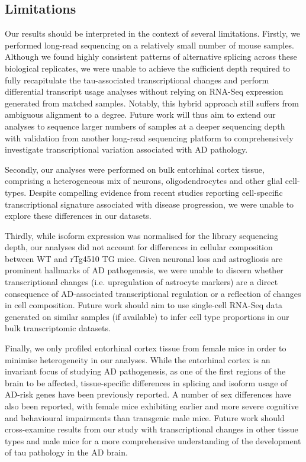 \subsection{Limitations}
Our results should be interpreted in the context of several limitations. Firstly, we performed long-read sequencing on a relatively small number of mouse samples. Although we found highly consistent patterns of alternative splicing across these biological replicates, we were unable to achieve the sufficient depth required to fully recapitulate the tau-associated transcriptional changes and perform differential transcript usage analyses without relying on RNA-Seq expression generated from matched samples. Notably, this hybrid approach still suffers from ambiguous alignment to a degree. Future work will thus aim to extend our analyses to sequence larger numbers of samples at a deeper sequencing depth with validation from another long-read sequencing platform to comprehensively investigate transcriptional variation associated with AD pathology. 

Secondly, our analyses were performed on bulk entorhinal cortex tissue, comprising a heterogeneous mix of neurons, oligodendrocytes and other glial cell-types. Despite compelling evidence from recent studies reporting cell-specific transcriptional signature associated with disease progression, we were unable to explore these differences in our datasets. 

Thirdly, while isoform expression was normalised for the library sequencing depth, our analyses did not account for differences in cellular composition between WT and rTg4510 TG mice. Given neuronal loss and astrogliosis are prominent hallmarks of AD pathogenesis, we were unable to discern whether transcriptional changes (i.e. upregulation of astrocyte markers) are a direct consequence of AD-associated transcriptional regulation or a reflection of changes in cell composition. Future work should aim to use single-cell RNA-Seq data generated on similar samples (if available) to infer cell type proportions in our bulk transcriptomic datasets. 

Finally, we only profiled entorhinal cortex tissue from female mice in order to minimise heterogeneity in our analyses. While the entorhinal cortex is an invariant focus of studying AD pathogenesis, as one of the first regions of the brain to be affected, tissue-specific differences in splicing and isoform usage of AD-risk genes have been previously reported\cite{Monti2021}. A number of sex differences have also been reported, with female mice exhibiting earlier and more severe cognitive and behavioural impairments than transgenic male mice\cite{M2011}. Future work should cross-examine results from our study with transcriptional changes in other tissue types and male mice for a more comprehensive understanding of the development of tau pathology in the AD brain. 

